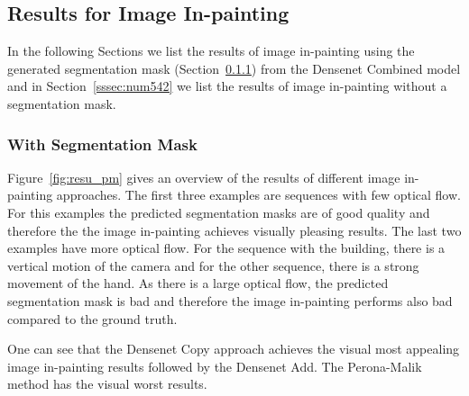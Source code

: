 \subsection{Results for Image In-painting}
\label{ssec:num54}

In the following Sections we list the results of image in-painting using the generated segmentation mask (Section~\ref{sssec:num541}) from the Densenet Combined model and in Section~\ref{sssec:num542} we list the results of image in-painting without a segmentation mask.

\subsubsection{With Segmentation Mask}
\label{sssec:num541}

Figure~\ref{fig:resu_pm} gives an overview of the results of different image in-painting approaches. The first three examples are sequences with few optical flow. For this examples the predicted segmentation masks are of good quality and therefore the the image in-painting achieves visually pleasing results. 
The last two examples have more optical flow. For the sequence with the building, there is a vertical motion of the camera and for the other sequence, there is a strong movement of the hand. As there is a large optical flow, the predicted segmentation mask is bad and therefore the image in-painting performs also bad compared to the ground truth.

One can see that the Densenet Copy approach achieves the visual most appealing image in-painting results followed by the Densenet Add. The Perona-Malik method has the visual worst results.

